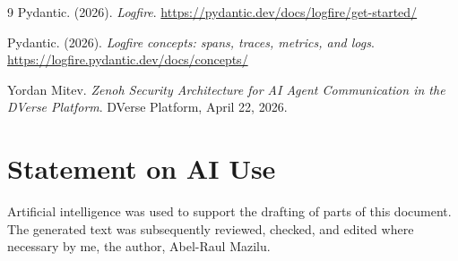 \documentclass[11pt]{article}
\begin{document}
\begin{thebibliography}{9}
Pydantic. (2026). \emph{Logfire}. \url{https://pydantic.dev/docs/logfire/get-started/}

Pydantic. (2026). \emph{Logfire concepts: spans, traces, metrics, and logs}. \url{https://logfire.pydantic.dev/docs/concepts/}

Yordan Mitev.
\newblock \emph{Zenoh Security Architecture for AI Agent Communication in the DVerse Platform}.
\newblock DVerse Platform, April 22, 2026.

\end{thebibliography}

\section*{Statement on AI Use} 

Artificial intelligence was used to support the drafting of parts of this document. The generated text was subsequently reviewed, checked, and edited where necessary by me, the author, Abel-Raul Mazilu.
\end{document}
